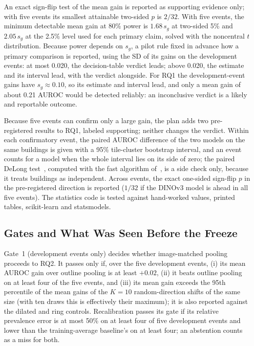 \documentclass[journal]{IEEEtran}
\begin{document}
An exact sign-flip test of the mean gain is reported as supporting evidence only; with five events its smallest attainable two-sided $p$ is $2/32$. With five events, the minimum detectable mean gain at 80\% power is $1.68\,s_g$ at two-sided 5\% and $2.05\,s_g$ at the 2.5\% level used for each primary claim, solved with the noncentral $t$ distribution. Because power depends on $s_g$, a pilot rule fixed in advance how a primary comparison is reported, using the SD of its gains on the development events: at most 0.020, the decision-table verdict leads; above 0.020, the estimate and its interval lead, with the verdict alongside. For RQ1 the development-event gains have $s_g\approx0.10$, so its estimate and interval lead, and only a mean gain of about 0.21 AUROC would be detected reliably: an inconclusive verdict is a likely and reportable outcome.

Because five events can confirm only a large gain, the plan adds two pre-registered results to RQ1, labeled supporting; neither changes the verdict. Within each confirmatory event, the paired AUROC difference of the two models on the same buildings is given with a 95\% tile-cluster bootstrap interval, and an event counts for a model when the whole interval lies on its side of zero; the paired DeLong test~\cite{delong1988comparing}, computed with the fast algorithm of~\cite{sun2014fast}, is a side check only, because it treats buildings as independent. Across events, the exact one-sided sign-flip $p$ in the pre-registered direction is reported ($1/32$ if the DINOv3 model is ahead in all five events). The statistics code is tested against hand-worked values, printed tables, scikit-learn and statsmodels.

\subsection{Gates and What Was Seen Before the Freeze}
Gate~1 (development events only) decides whether image-matched pooling proceeds to RQ2. It passes only if, over the five development events, (i) its mean AUROC gain over outline pooling is at least $+0.02$, (ii) it beats outline pooling on at least four of the five events, and (iii) its mean gain exceeds the 95th percentile of the mean gains of the $K=10$ random-direction shifts of the same size (with ten draws this is effectively their maximum); it is also reported against the dilated and ring controls. Recalibration passes its gate if its relative prevalence error is at most 50\% on at least four of five development events and lower than the training-average baseline's on at least four; an abstention counts as a miss for both.
\end{document}
